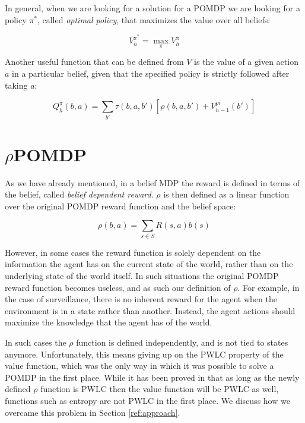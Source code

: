 In general, when we are looking for a solution for a POMDP we are looking for a policy $\pi^*$, called
\textit{optimal policy}, that maximizes the value over all beliefs:

\[ V^{\pi^*}_h = \max_\pi V^{\pi}_h \]

Another useful function that can be defined from $V$ is the value of a given action $a$ in a
particular belief, given that the specified policy is strictly followed after taking $a$:

\[ Q^{\pi}_h(b, a) = \sum_{b'} \tau(b,a,b') \left[ \rho(b,a,b') + V^{pi}_{h-1}(b') \right ] \]

\section{$\rho$POMDP}

As we have already mentioned, in a belief MDP the reward is defined in terms of the belief, called
\textit{belief dependent reward}. $\rho$ is then defined as a linear function over the original
POMDP reward function and the belief space:

\[ \rho(b,a) = \sum_{s\in S} R(s,a) b(s) \]

However, in some cases the reward function is solely dependent on the information the agent has on
the current state of the world, rather than on the underlying state of the world itself. In such
situations the original POMDP reward function becomes useless, and as such our definition of $\rho$.
For example, in the case of surveillance, there is no inherent reward for the agent when the
environment is in a state rather than another. Instead, the agent actions should maximize the
knowledge that the agent has of the world.

In such cases the $\rho$ function is defined independently, and is not tied to states anymore.
Unfortunately, this means giving up on the PWLC property of the value function, which was the only
way in which it was possible to solve a POMDP in the first place. While it has been proved in
\cite{cit:rpomdp} that as long as the newly defined $\rho$ function is PWLC then the value function
will be PWLC as well, functions such as entropy are not PWLC in the first place. We discuss how we
overcame this problem in Section \ref{ref:approach}.
